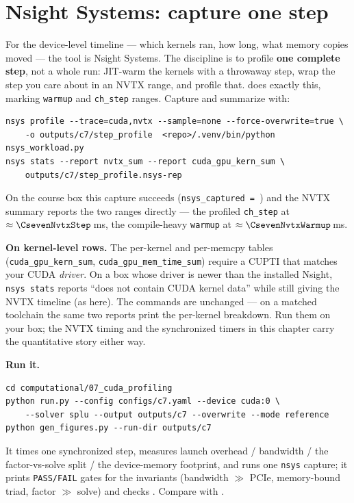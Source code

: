\section{Nsight Systems: capture one step}

For the device-level timeline --- which kernels ran, how long, what memory
copies moved --- the tool is Nsight Systems. The discipline is to profile
\textbf{one complete step}, not a whole run: JIT-warm the kernels with a
throwaway step, wrap the step you care about in an NVTX range, and profile that.
 does exactly this, marking \texttt{warmup} and
\texttt{ch\_step} ranges. Capture and summarize with:
\begin{lstlisting}
nsys profile --trace=cuda,nvtx --sample=none --force-overwrite=true \
    -o outputs/c7/step_profile  <repo>/.venv/bin/python nsys_workload.py
nsys stats --report nvtx_sum --report cuda_gpu_kern_sum \
    outputs/c7/step_profile.nsys-rep
\end{lstlisting}
On the course box this capture succeeds (\texttt{nsys\_captured =
\CsevenNsysCaptured}) and the NVTX summary reports the two ranges directly ---
the profiled \texttt{ch\_step} at $\approx\CsevenNvtxStep$\,ms, the compile-heavy
\texttt{warmup} at $\approx\CsevenNvtxWarmup$\,ms.

\begin{keybox}
\textbf{On kernel-level rows.} The per-kernel and per-memcpy tables
(\texttt{cuda\_gpu\_kern\_sum}, \texttt{cuda\_gpu\_mem\_time\_sum}) require a
CUPTI that matches your CUDA \emph{driver}. On a box whose driver is newer than
the installed Nsight, \texttt{nsys stats} reports ``does not contain CUDA kernel
data'' while still giving the NVTX timeline (as here). The commands are
unchanged --- on a matched toolchain the same two reports print the per-kernel
breakdown. Run them on your box; the NVTX timing and the synchronized timers in
this chapter carry the quantitative story either way.
\end{keybox}

\begin{runbox}
\textbf{Run it.}
\begin{lstlisting}
cd computational/07_cuda_profiling
python run.py --config configs/c7.yaml --device cuda:0 \
    --solver splu --output outputs/c7 --overwrite --mode reference
python gen_figures.py --run-dir outputs/c7
\end{lstlisting}
It times one synchronized step, measures launch overhead / bandwidth / the
factor-vs-solve split / the device-memory footprint, and runs one
\texttt{nsys} capture; it prints \texttt{PASS/FAIL} gates for the invariants
(bandwidth $\gg$ PCIe, memory-bound triad, factor $\gg$ solve) and checks
\file{baseline.yaml}. Compare with \file{EXPECTED.md}.
\end{runbox}

